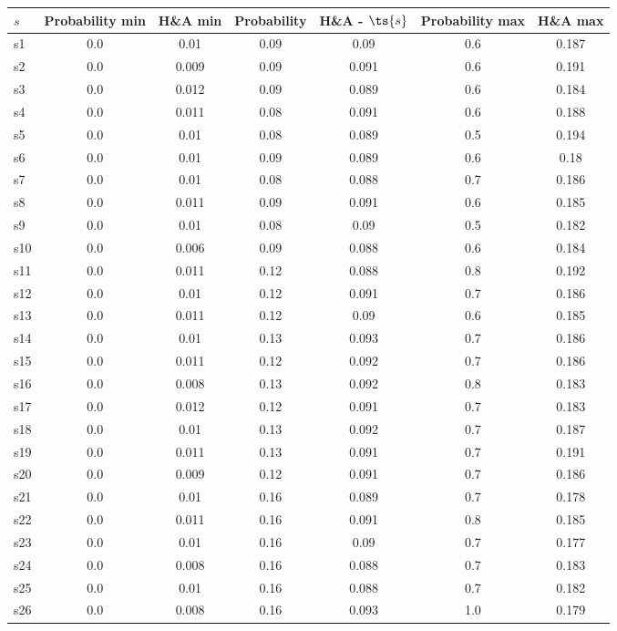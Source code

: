 \documentclass{article}
\begin{document}
\noindent\begin{tabular}{|l|c|c|c|c|c|c|}
\hline
$s$& Probability min & H\&A min & Probability & H\&A - $\ts{s}$ & Probability max & H\&A max\\
\hline
s1 &0.0 & 0.01 & 0.09 & 0.09 & 0.6 & 0.187\\
\hline
s2 &0.0 & 0.009 & 0.09 & 0.091 & 0.6 & 0.191\\
\hline
s3 &0.0 & 0.012 & 0.09 & 0.089 & 0.6 & 0.184\\
\hline
s4 &0.0 & 0.011 & 0.08 & 0.091 & 0.6 & 0.188\\
\hline
s5 &0.0 & 0.01 & 0.08 & 0.089 & 0.5 & 0.194\\
\hline
s6 &0.0 & 0.01 & 0.09 & 0.089 & 0.6 & 0.18\\
\hline
s7 &0.0 & 0.01 & 0.08 & 0.088 & 0.7 & 0.186\\
\hline
s8 &0.0 & 0.011 & 0.09 & 0.091 & 0.6 & 0.185\\
\hline
s9 &0.0 & 0.01 & 0.08 & 0.09 & 0.5 & 0.182\\
\hline
s10 &0.0 & 0.006 & 0.09 & 0.088 & 0.6 & 0.184\\
\hline
s11 &0.0 & 0.011 & 0.12 & 0.088 & 0.8 & 0.192\\
\hline
s12 &0.0 & 0.01 & 0.12 & 0.091 & 0.7 & 0.186\\
\hline
s13 &0.0 & 0.011 & 0.12 & 0.09 & 0.6 & 0.185\\
\hline
s14 &0.0 & 0.01 & 0.13 & 0.093 & 0.7 & 0.186\\
\hline
s15 &0.0 & 0.011 & 0.12 & 0.092 & 0.7 & 0.186\\
\hline
s16 &0.0 & 0.008 & 0.13 & 0.092 & 0.8 & 0.183\\
\hline
s17 &0.0 & 0.012 & 0.12 & 0.091 & 0.7 & 0.183\\
\hline
s18 &0.0 & 0.01 & 0.13 & 0.092 & 0.7 & 0.187\\
\hline
s19 &0.0 & 0.011 & 0.13 & 0.091 & 0.7 & 0.191\\
\hline
s20 &0.0 & 0.009 & 0.12 & 0.091 & 0.7 & 0.186\\
\hline
s21 &0.0 & 0.01 & 0.16 & 0.089 & 0.7 & 0.178\\
\hline
s22 &0.0 & 0.011 & 0.16 & 0.091 & 0.8 & 0.185\\
\hline
s23 &0.0 & 0.01 & 0.16 & 0.09 & 0.7 & 0.177\\
\hline
s24 &0.0 & 0.008 & 0.16 & 0.088 & 0.7 & 0.183\\
\hline
s25 &0.0 & 0.01 & 0.16 & 0.088 & 0.7 & 0.182\\
\hline
s26 &0.0 & 0.008 & 0.16 & 0.093 & 1.0 & 0.179\\

\end{tabular}
\end{document}
